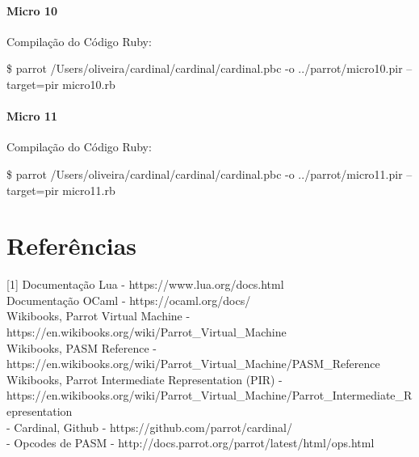 \documentclass[12pt,a4paper,twoside]{report}
\begin{document}
\subsubsection{Micro 10}


Compilação do Código Ruby:
\begin{terminal}
\$ parrot /Users/oliveira/cardinal/cardinal/cardinal.pbc -o
../parrot/micro10.pir --target=pir micro10.rb
\end{terminal}


\subsubsection{Micro 11}


Compilação do Código Ruby:
\begin{terminal}
\$ parrot /Users/oliveira/cardinal/cardinal/cardinal.pbc -o
../parrot/micro11.pir --target=pir micro11.rb
\end{terminal}




\chapter{Referências}
[1] Documentação Lua - https://www.lua.org/docs.html \\
[2] Documentação OCaml - https://ocaml.org/docs/ \\
[3] Wikibooks, Parrot Virtual Machine - https://en.wikibooks.org/wiki/Parrot_Virtual_Machine \\
[4] Wikibooks, PASM Reference -
https://en.wikibooks.org/wiki/Parrot_Virtual_Machine/PASM_Reference \\
[5] Wikibooks, Parrot Intermediate Representation (PIR) -
https://en.wikibooks.org/wiki/Parrot_Virtual_Machine/Parrot_Intermediate_Representation
\\
[6] - Cardinal, Github - https://github.com/parrot/cardinal/ \\
[7] - Opcodes de PASM - http://docs.parrot.org/parrot/latest/html/ops.html \\

\clearpage
{}
\appendix
\end{document}
